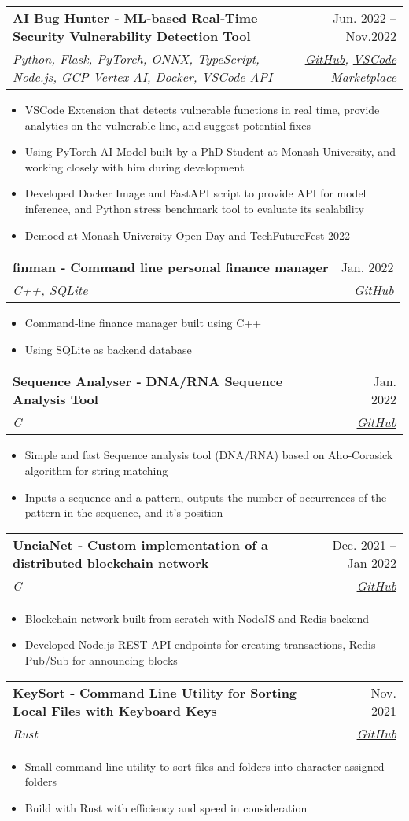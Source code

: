 \documentclass[a4paper,11pt]{article}
\makeatletter
\newcommand{\resumeItem}[1]{
    \item\small{
            {\footnotesize#1 \vspace{-4pt}}
    }
}
\newcommand{\resumeSubheading}[4]{
    \vspace{-2pt}\item
    \begin{tabular*}{0.97\textwidth}[t]{l@{\extracolsep{\fill}}r}
        \textbf{#1} & \fontsize{10}{10}\selectfont#2 \\
        \textit{\footnotesize#3} & \textit{\footnotesize #4} \\
    \end{tabular*}\vspace{-7pt}
}
\newcommand{\resumeItemListStart}{\begin{itemize}[leftmargin=0.2in]}
\newcommand{\resumeItemListEnd}{\end{itemize}\vspace{-5pt}}
\makeatother
\begin{document}
\resumeSubheading
{AI Bug Hunter ‐ ML‐based Real‐Time Security Vulnerability Detection Tool}{Jun. 2022 -- Nov.2022}
{Python, Flask, PyTorch, ONNX, TypeScript, Node.js, GCP Vertex AI, Docker, VSCode API}{\href{https://github.com/aibughunter/aibughunter}{GitHub}, \href{https://marketplace.visualstudio.com/items?itemName=AIBugHunter.aibughunter}{VSCode Marketplace}}
\resumeItemListStart
\resumeItem{VSCode Extension that detects vulnerable functions in real time, provide analytics on the vulnerable line, and suggest potential fixes}
\resumeItem{Using PyTorch AI Model built by a PhD Student at Monash University, and working closely with him during development}
\resumeItem{Developed Docker Image and FastAPI script to provide API for model inference, and Python stress benchmark tool to evaluate its scalability}
\resumeItem{Demoed at Monash University Open Day and TechFutureFest 2022}
\resumeItemListEnd

\resumeSubheading
{finman ‐ Command line personal finance manager}{Jan. 2022}
{C++, SQLite}{\href{https://github.com/UnciaBit/finman}{GitHub}}
\resumeItemListStart
\resumeItem{Command‐line finance manager built using C++}
\resumeItem{Using SQLite as backend database}
\resumeItemListEnd

\resumeSubheading
{Sequence Analyser ‐ DNA/RNA Sequence Analysis Tool}{Jan. 2022}
{C}{\href{https://github.com/UnciaBit/Sequence-Analysis}{GitHub}}
\resumeItemListStart
\resumeItem{Simple and fast Sequence analysis tool (DNA/RNA) based on Aho‐Corasick algorithm for string matching}
\resumeItem{Inputs a sequence and a pattern, outputs the number of occurrences of the pattern in the sequence, and it’s position}
\resumeItemListEnd

\resumeSubheading
{UnciaNet ‐ Custom implementation of a distributed blockchain network}{Dec. 2021 -- Jan 2022}
{C}{\href{https://github.com/UnciaBit/UnciaNet-FE}{GitHub}}
\resumeItemListStart
\resumeItem{Blockchain network built from scratch with NodeJS and Redis backend}
\resumeItem{Developed Node.js REST API endpoints for creating transactions, Redis Pub/Sub for announcing blocks}
\resumeItemListEnd

\resumeSubheading
{KeySort ‐ Command Line Utility for Sorting Local Files with Keyboard Keys}{Nov. 2021}
{Rust}{\href{https://github.com/UnciaBit/keysort}{GitHub}}
\resumeItemListStart
\resumeItem{Small command‐line utility to sort files and folders into character assigned folders}
\resumeItem{Build with Rust with efficiency and speed in consideration}
\resumeItemListEnd
\end{document}

